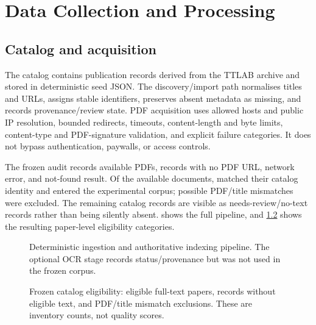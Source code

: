 \chapter{Data Collection and Processing}
\label{ch:data}

\section{Catalog and acquisition}

The catalog contains \CatalogPaperCount{} publication records derived from the TTLAB archive and stored in deterministic seed JSON. The discovery/import path normalises titles and URLs, assigns stable identifiers, preserves absent metadata as missing, and records provenance/review state. PDF acquisition uses allowed hosts and public IP resolution, bounded redirects, timeouts, content-length and byte limits, content-type and PDF-signature validation, and explicit failure categories. It does not bypass authentication, paywalls, or access controls.

The frozen audit records \AvailablePdfCount{} available PDFs, \NoPdfUrlCount{} records with no PDF URL, \PdfNetworkErrorCount{} network error, and \PdfNotFoundCount{} not-found result. Of the available documents, \EligiblePaperCount{} matched their catalog identity and entered the experimental corpus; \MismatchPaperCount{} possible PDF/title mismatches were excluded. The remaining \NoTextPaperCount{} catalog records are visible as needs-review/no-text records rather than being silently absent.  shows the full pipeline, and \cref{fig:corpus-status} shows the resulting paper-level eligibility categories.

\begin{figure}[htbp]
\centering
\resizebox{0.99\textwidth}{!}{}
\caption[Deterministic ingestion and authoritative indexing pipeline.]{Deterministic ingestion and authoritative indexing pipeline. The optional OCR stage records status/provenance but was not used in the frozen corpus.}
\label{fig:ingestion}
\end{figure}

\begin{figure}[htbp]
\centering

\caption[Frozen catalog eligibility.]{Frozen catalog eligibility: \EligiblePaperCount{} eligible full-text papers, \NoTextPaperCount{} records without eligible text, and \MismatchPaperCount{} PDF/title mismatch exclusions. These are inventory counts, not quality scores.}
\label{fig:corpus-status}
\end{figure}

